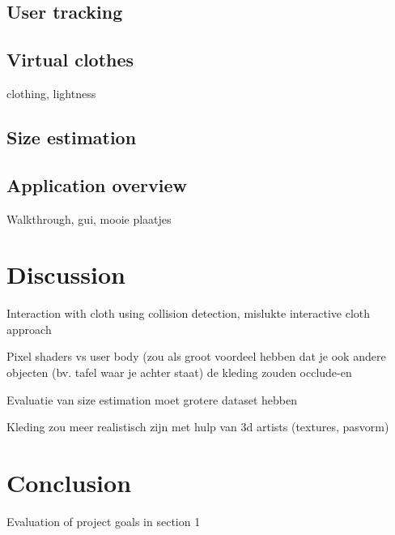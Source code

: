 \documentclass[a4paper]{article}
\begin{document}
\subsection{User tracking}

\subsection{Virtual clothes}

clothing, lightness

\subsection{Size estimation}

\subsection{Application overview}

Walkthrough, gui, mooie plaatjes

\section{Discussion}

Interaction with cloth using collision detection, mislukte interactive cloth approach

Pixel shaders vs user body (zou als groot voordeel hebben dat je ook andere objecten (bv. tafel waar je achter staat) de kleding zouden occlude-en

Evaluatie van size estimation moet grotere dataset hebben

Kleding zou meer realistisch zijn met hulp van 3d artists (textures, pasvorm)

\section{Conclusion}

Evaluation of project goals in section 1
\end{document}
